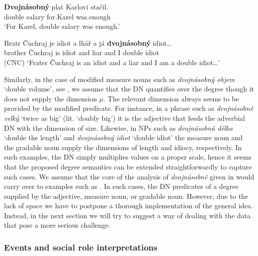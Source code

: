 \documentclass[output=paper,
modfonts,
hidelinks,
newtxmath
]{langscibook}
\begin{document}
\ea\label{dvojnasobne-degree-context} \gll \textbf{Dvojnásobný} plat Karlovi stačil.\\
double salary for.Karel was.enough\\
\glt `For Karel, double salary was enough.'
\z

\ea\label{dvojnasobny-idiot-cnc} \gll Bratr Čuchraj je idiot a lhář a já \textbf{dvojnásobný} idiot\ldots \label{dvojnasobny-idiot}\\
brother Čuchraj is idiot and liar and I double idiot\\\hfill(CNC)
\glt `Frater Čuchraj is an idiot and a liar and I am a double idiot\ldots'
\z

\noindent Similarly, in the case of modified measure nouns such as \textit{dvojnásobný objem} `double volume', see , we assume that the DN quantifies over the degree though it does not supply the dimension $\mu$. The relevant dimension always seems to be provided by the modified predicate. For instance, in a phrase such as \textit{dvojnásobně velký} `twice as big' (lit. `doubly big') it is the adjective that feeds the adverbial DN with the dimension of size. Likewise, in NPs such as \textit{dvojnásobná délka} `double the length' and \textit{dvojnásobný idiot} `double idiot' the measure noun and the gradable noun supply the dimensions of length and idiocy, respectively. In such examples, the DN simply multiplies values on a proper scale, hence it seems that the proposed degree semantics can be extended straightforwardly to capture such cases. We assume that the core of the analysis of \textit{dvojnásobně} given in  would carry over to examples such as . In such cases, the DN predicates of a degree supplied by the adjective, measure noun, or gradable noun. However, due to the lack of space we have to postpone a thorough implementation of the general idea. Instead, in the next section we will try to suggest a way of dealing with the data that pose a more serious challenge.

\subsubsection{Events and social role interpretations}\label{events-and-social-role-interpretations}
\end{document}
